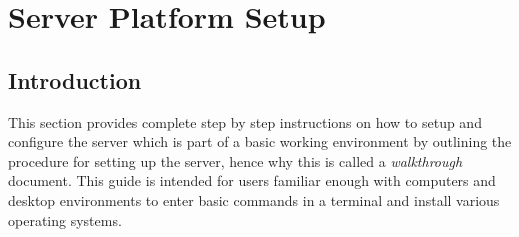 \chapter{\cernvmreleasetesting Server Platform Setup}
\label{sec:serversetup}

\section{Introduction}
This section provides complete step by step instructions on how to setup and configure the \tapper server which is part of a basic 
working \releasetesting environment by outlining the procedure for setting up the server, hence why this is called a \emph{walkthrough} 
document. This guide is intended for users familiar enough with computers and desktop environments to enter basic commands in a terminal 
and install various operating systems. 